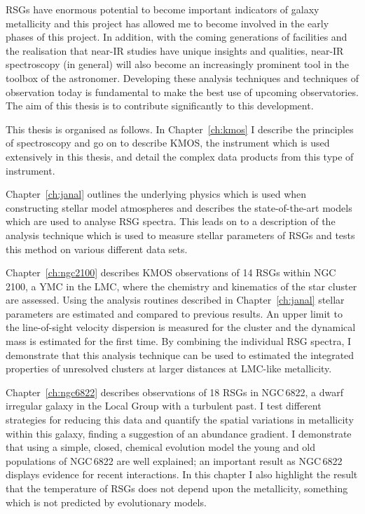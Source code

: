 RSGs have enormous potential to become important indicators of galaxy metallicity and this project has allowed me to become involved in the early phases of this project.
In addition, with the coming generations of facilities and the realisation that near-IR studies have unique insights and qualities, near-IR spectroscopy (in general) will also become an increasingly prominent tool in the toolbox of the astronomer.
Developing these analysis techniques and techniques of observation today is fundamental to make the best use of upcoming observatories.
The aim of this thesis is to contribute significantly to this development.

This thesis is organised as follows.
In Chapter~\ref{ch:kmos} I describe the principles of spectroscopy and go on to describe KMOS, the instrument which is used extensively in this thesis, and detail the complex data products from this type of instrument.

Chapter~\ref{ch:janal} outlines the underlying physics which is used when constructing stellar model atmospheres and describes the state-of-the-art models which are used to analyse RSG spectra.
This leads on to a description of the analysis technique which is used to measure stellar parameters of RSGs and tests this method on various different data sets.

Chapter~\ref{ch:ngc2100} describes KMOS observations of 14 RSGs within NGC\,2100, a YMC in the LMC, where the chemistry and kinematics of the star cluster are assessed.
Using the analysis routines described in Chapter~\ref{ch:janal} stellar parameters are estimated and compared to previous results. An upper limit to the line-of-sight velocity dispersion is measured for the cluster and the dynamical mass is estimated for the first time.
By combining the individual RSG spectra, I demonstrate that this analysis technique can be used to estimated the integrated properties of unresolved clusters at larger distances at LMC-like metallicity.

Chapter~\ref{ch:ngc6822} describes observations of 18 RSGs in NGC\,6822, a dwarf irregular galaxy in the Local Group with a turbulent past.
I test different strategies for reducing this data and quantify the spatial variations in metallicity within this galaxy, finding a suggestion of an abundance gradient.
I demonstrate that using a simple, closed, chemical evolution model the young and old populations of NGC\,6822 are well explained; an important result as NGC\,6822 displays evidence for recent interactions.
In this chapter I also highlight the result that the temperature of RSGs does not depend upon the metallicity, something which is not predicted by evolutionary models.

